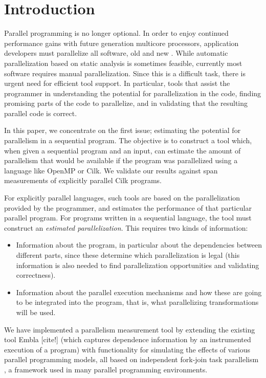 \section{Introduction}

Parallel programming is no longer optional.  In order to enjoy continued
performance gains with future generation multicore processors,
application developers must parallelize all software, old and
new
.  
While automatic parallelization based on static analysis 
is sometimes feasible, currently most software requires manual
parallelization.
Since this is a difficult task, there is urgent need for efficient tool support. 
In particular, tools that assist the programmer in understanding the potential 
for parallelization in the code, finding promising parts of the code to parallelize, 
and in validating that the resulting parallel code is correct.

In this paper, we concentrate on the first issue; estimating the potential 
for parallelism in a sequential program. The objective is to construct a tool
which, when given a sequential program and an input, can estimate the 
amount of parallelism that would be available if the program was parallelized
using a language like OpenMP or Cilk. We validate our results against span 
measurements of explicitly parallel Cilk programs.

For explicitly parallel languages, 
such tools are based on the parallelization provided by the programmer, and 
estimates the performance of that particular parallel program. For programs written
in a sequential language, the tool must construct
an {\em estimated parallelization}. This requires two kinds of information:
\begin{itemize}
\item
Information about the program, in particular about the dependencies between 
different parts, since these determine which parallelization is legal (this 
information is also needed to find parallelization opportunities and validating 
correctness).
\item
Information about the parallel execution mechanisms and how these are going
to be integrated into the program, that is, what parallelizing transformations 
will be used.
\end{itemize}
We have implemented a parallelism measurement tool by extending the existing
tool Embla [cite!] (which captures dependence information by an instrumented 
execution of a program) with functionality for simulating the effects of various parallel 
programming models, all based on independent fork-join task parallelism
, a framework used in many parallel programming environments.

